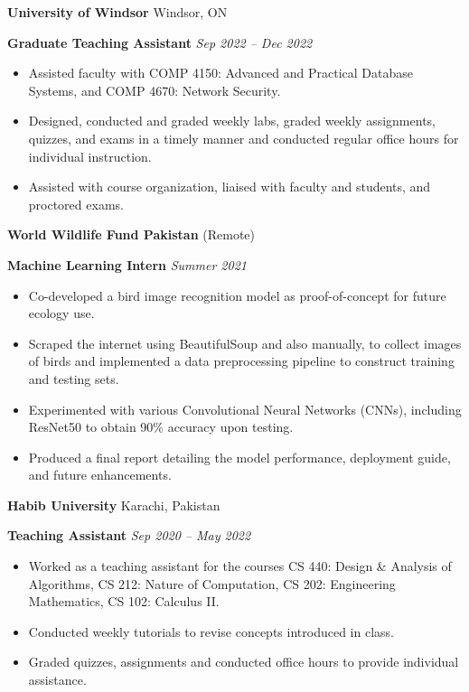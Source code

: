 \documentclass[12pt, a4paper]{article}
\begin{document}
\vspace{16pt}
\textbf{University of Windsor} \hfill Windsor, ON

\textbf{Graduate Teaching Assistant} \hfill \textit{Sep 2022 -- Dec 2022}
\begin{itemize}[noitemsep, topsep=0pt, partopsep=0pt, parsep=0pt]
	\item Assisted faculty with COMP 4150: Advanced and Practical Database Systems, and COMP 4670: Network Security.
	\item Designed, conducted and graded weekly labs, graded weekly assignments, quizzes, and exams in a timely manner and conducted regular office hours for individual instruction.
	\item Assisted with course organization, liaised with faculty and students, and proctored exams.
\end{itemize}

\vspace{12pt}
\textbf{World Wildlife Fund Pakistan} \hfill (Remote)

\textbf{Machine Learning Intern} \hfill \textit{Summer 2021}

\begin{itemize}[noitemsep, topsep=0pt, partopsep=0pt, parsep=0pt]
	\item Co-developed a bird image recognition model as proof-of-concept for future ecology use.
	\item Scraped the internet using BeautifulSoup and also manually, to collect images of birds and implemented a data preprocessing pipeline to construct training and testing sets.
	\item Experimented with various Convolutional Neural Networks (CNNs), including ResNet50 to obtain 90\% accuracy upon testing.
	\item Produced a final report detailing the model performance, deployment guide, and future enhancements.
\end{itemize}

\vspace{12pt}
\textbf{Habib University} \hfill Karachi, Pakistan

\textbf{Teaching Assistant} \hfill \textit{Sep 2020 -- May 2022}

\begin{itemize}[noitemsep, topsep=0pt, partopsep=0pt, parsep=0pt]
	\item Worked as a teaching assistant for the courses CS 440: Design \& Analysis of Algorithms, CS 212: Nature of Computation, CS 202: Engineering Mathematics, CS 102: Calculus II.
	\item Conducted weekly tutorials to revise concepts introduced in class.
	\item Graded quizzes, assignments and conducted office hours to provide individual assistance.
\end{itemize}
\end{document}
